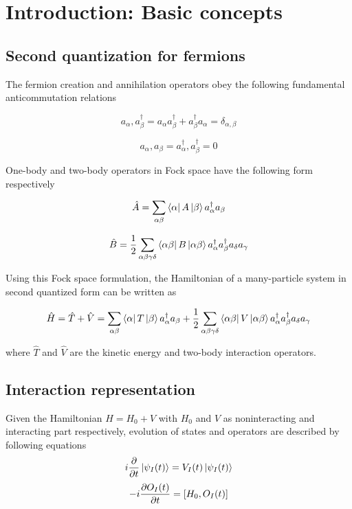 \section{Introduction: Basic concepts}
\subsection{Second quantization for fermions}
The fermion creation and annihilation operators obey the following fundamental anticommutation relations

\begin{equation} {a_\alpha,a_\beta^\dagger} = a_\alpha a_\beta^\dagger + a_\beta^\dagger a_\alpha = \delta_{\alpha,\beta} \end{equation}

\begin{equation} {a_\alpha,a_\beta} = {a_\alpha^\dagger,a_\beta^\dagger} = 0 \end{equation}

One-body and two-body operators in Fock space have the following form respectively

\begin{equation} \hat{A} = \sum_{\alpha\beta}\bra{\alpha}A\ket{\beta}a_\alpha^\dagger a_\beta \end{equation}

\begin{equation} \hat{B} = \frac{1}{2} \sum_{\alpha\beta\gamma\delta}\bra{\alpha\beta}B\ket{\alpha\beta} a_\alpha^\dagger a_\beta^\dagger a_\delta a_\gamma \end{equation}

Using this Fock space formulation, the Hamiltonian of a many-particle system in second quantized form can be written as

\begin{equation} \hat{H} = \hat{T}+\hat{V} = \sum_{\alpha\beta}\bra{\alpha}T\ket{\beta}a_\alpha^\dagger a_\beta 
    + \frac{1}{2} \sum_{\alpha\beta\gamma\delta}\bra{\alpha\beta}V\ket{\alpha\beta} a_\alpha^\dagger a_\beta^\dagger a_\delta a_\gamma\end{equation}

where $\hat{T}$ and $\hat{V}$ are the kinetic energy and two-body interaction operators.

\subsection{Interaction representation}
Given the Hamiltonian $H=H_0+V$ with $H_0$ and $V$ as noninteracting and interacting part respectively,
evolution of states and operators are described by following equations
\begin{equation} i\frac{\partial }{\partial t}\ket{\psi_I(t)}=V_I(t)\ket{\psi_I(t)} \end{equation}
\begin{equation} -i\frac{\partial O_I(t)}{\partial t}=\left[H_0,O_I(t)\right] \end{equation}

